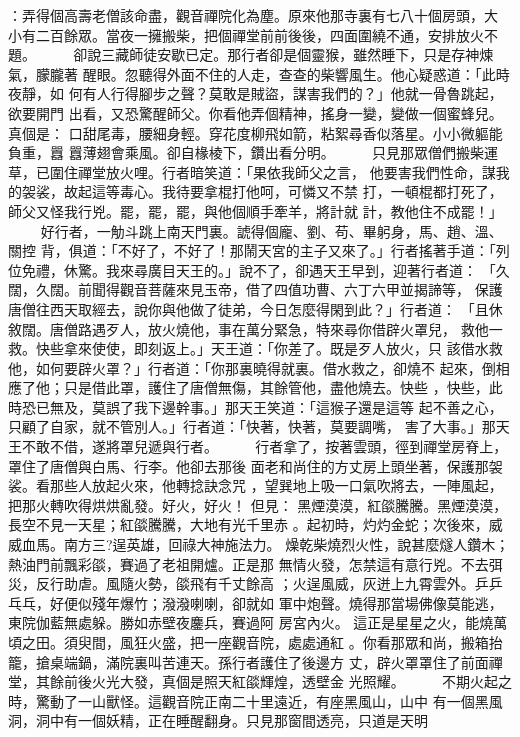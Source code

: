 \begin{pinyinscope}
{：弄得個高壽老僧該命盡，觀音禪院化為塵。原來他那寺裏有七八十個房頭，大
小有二百餘眾。當夜一擁搬柴，把個禪堂前前後後，四面圍繞不通，安排放火不
題。
　　
卻說三藏師徒安歇已定。那行者卻是個靈猴，雖然睡下，只是存神煉氣，朦朧著
醒眼。忽聽得外面不住的人走，查查的柴響風生。他心疑惑道：「此時夜靜，如
何有人行得腳步之聲？莫敢是賊盜，謀害我們的？」他就一骨魯跳起，欲要開門
出看，又恐驚醒師父。你看他弄個精神，搖身一變，變做一個蜜蜂兒。真個是：
口甜尾毒，腰細身輕。穿花度柳飛如箭，粘絮尋香似落星。小小微軀能負重，囂
囂薄翅會乘風。卻自椽棱下，鑽出看分明。
　　
只見那眾僧們搬柴運草，已圍住禪堂放火哩。行者暗笑道：「果依我師父之言，
他要害我們性命，謀我的袈裟，故起這等毒心。我待要拿棍打他呵，可憐又不禁
打，一頓棍都打死了，師父又怪我行兇。罷，罷，罷，與他個順手牽羊，將計就
計，教他住不成罷！」
　　
好行者，一觔斗跳上南天門裏。諕得個龐、劉、苟、畢躬身，馬、趙、溫、關控
背，俱道：「不好了，不好了！那鬧天宮的主子又來了。」行者搖著手道：「列
位免禮，休驚。我來尋廣目天王的。」說不了，卻遇天王早到，迎著行者道：
「久闊，久闊。前聞得觀音菩薩來見玉帝，借了四值功曹、六丁六甲並揭諦等，
保護唐僧往西天取經去，說你與他做了徒弟，今日怎麼得閑到此？」行者道：
「且休敘闊。唐僧路遇歹人，放火燒他，事在萬分緊急，特來尋你借辟火罩兒，
救他一救。快些拿來使使，即刻返上。」天王道：「你差了。既是歹人放火，只
該借水救他，如何要辟火罩？」行者道：「你那裏曉得就裏。借水救之，卻燒不
起來，倒相應了他；只是借此罩，護住了唐僧無傷，其餘管他，盡他燒去。快些
，快些，此時恐已無及，莫誤了我下邊幹事。」那天王笑道：「這猴子還是這等
起不善之心，只顧了自家，就不管別人。」行者道：「快著，快著，莫要調嘴，
害了大事。」那天王不敢不借，遂將罩兒遞與行者。
　　
行者拿了，按著雲頭，徑到禪堂房脊上，罩住了唐僧與白馬、行李。他卻去那後
面老和尚住的方丈房上頭坐著，保護那袈裟。看那些人放起火來，他轉捻訣念咒
，望巽地上吸一口氣吹將去，一陣風起，把那火轉吹得烘烘亂發。好火，好火！
但見：
黑煙漠漠，紅燄騰騰。黑煙漠漠，長空不見一天星；紅燄騰騰，大地有光千里赤
。起初時，灼灼金蛇；次後來，威威血馬。南方三?逞英雄，回祿大神施法力。
燥乾柴燒烈火性，說甚麼燧人鑽木；熱油門前飄彩燄，賽過了老祖開爐。正是那
無情火發，怎禁這有意行兇。不去弭災，反行助虐。風隨火勢，燄飛有千丈餘高
；火逞風威，灰迸上九霄雲外。乒乒乓乓，好便似殘年爆竹；潑潑喇喇，卻就如
軍中炮聲。燒得那當場佛像莫能逃，東院伽藍無處躲。勝如赤壁夜鏖兵，賽過阿
房宮內火。
這正是星星之火，能燒萬頃之田。須臾間，風狂火盛，把一座觀音院，處處通紅
。你看那眾和尚，搬箱抬籠，搶桌端鍋，滿院裏叫苦連天。孫行者護住了後邊方
丈，辟火罩罩住了前面禪堂，其餘前後火光大發，真個是照天紅燄輝煌，透壁金
光照耀。
　　
不期火起之時，驚動了一山獸怪。這觀音院正南二十里遠近，有座黑風山，山中
有一個黑風洞，洞中有一個妖精，正在睡醒翻身。只見那窗間透亮，只道是天明
}
\end{pinyinscope}
